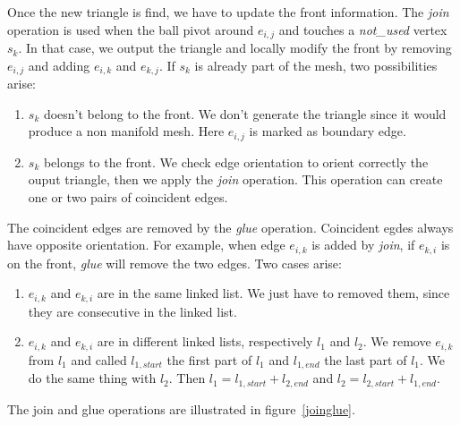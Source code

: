 \documentclass[12pt]{article}
\begin{document}
Once the new triangle is find, we have to update the front information. The \textit{join} operation is used when the ball pivot around $e_{i,j}$ and touches a \textit{not\_used} vertex $s_k$. In that case, we output the triangle and locally modify the front by removing $e_{i,j}$ and adding $e_{i,k}$ and $e_{k,j}$. If $s_k$ is already part of the mesh, two possibilities arise:
\begin{enumerate}
\item $s_k$ doesn't belong to the front. We don't generate the triangle since it would produce a non manifold mesh. Here $e_{i,j}$ is marked as boundary edge.
\item $s_k$ belongs to the front. We check edge orientation to orient correctly the ouput triangle, then we apply the \textit{join} operation. This operation can create one or two pairs of coincident edges.
\end{enumerate}

The coincident edges are removed by the \textit{glue} operation. Coincident egdes always have opposite orientation. For example, when edge $e_{i,k}$ is added by \textit{join}, if $e_{k,i}$ is on the front, \textit{glue} will remove the two edges. Two cases arise:
\begin{enumerate}
\item $e_{i,k}$ and $e_{k,i}$ are in the same linked list. We just have to removed them, since they are consecutive in the linked list.
\item $e_{i,k}$ and $e_{k,i}$ are in different linked lists, respectively $l_1$ and $l_2$. We remove $e_{i,k}$ from $l_1$ and called $l_{1,start}$ the first part of $l_1$ and $l_{1,end}$ the last part of $l_1$. We do the same thing with $l_2$. Then $l_1 = l_{1,start}+l_{2,end}$ and $l_2 = l_{2,start}+l_{1,end}$.
\end{enumerate}

The join and glue operations are illustrated in figure~\ref{joinglue}.
\end{document}
